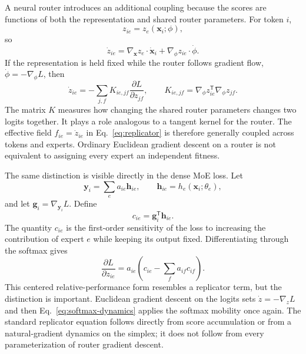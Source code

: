 \documentclass[11pt]{article}
\begin{document}
A neural router introduces an additional coupling because the scores are functions of both the representation and shared router parameters. For token $i$,
\begin{equation}
z_{ie}
=
z_e(\mathbf x_i;\phi),
\end{equation}
so
\begin{equation}
\dot z_{ie}
=
\nabla_{\mathbf x}z_e\cdot\dot{\mathbf x}_i
+
\nabla_\phi z_{ie}\cdot\dot\phi.
\label{eq:score-velocity}
\end{equation}
If the representation is held fixed while the router follows gradient flow, $\dot\phi=-\nabla_\phi L$, then
\begin{equation}
\dot z_{ie}
=
-
\sum_{j,f}
K_{ie,jf}
\frac{\partial L}{\partial z_{jf}},
\qquad
K_{ie,jf}
=
\nabla_\phi z_{ie}^{\mathsf T}
\nabla_\phi z_{jf}.
\label{eq:router-kernel}
\end{equation}
The matrix $K$ measures how changing the shared router parameters changes two logits together. It plays a role analogous to a tangent kernel for the router. The effective field $f_{ie}=\dot z_{ie}$ in Eq.~\eqref{eq:replicator} is therefore generally coupled across tokens and experts. Ordinary Euclidean gradient descent on a router is not equivalent to assigning every expert an independent fitness.

The same distinction is visible directly in the dense MoE loss. Let
\begin{equation}
\mathbf y_i
=
\sum_e a_{ie}\mathbf h_{ie},
\qquad
\mathbf h_{ie}
=
h_e(\mathbf x_i;\theta_e),
\end{equation}
and let $\mathbf g_i=\nabla_{\mathbf y_i}L$. Define
\begin{equation}
c_{ie}
=
\mathbf g_i^{\mathsf T}\mathbf h_{ie}.
\end{equation}
The quantity $c_{ie}$ is the first-order sensitivity of the loss to increasing the contribution of expert $e$ while keeping its output fixed. Differentiating through the softmax gives
\begin{equation}
\frac{\partial L}{\partial z_{ie}}
=
a_{ie}
\left(
c_{ie}
-
\sum_f a_{if}c_{if}
\right).
\label{eq:router-gradient}
\end{equation}
This centered relative-performance form resembles a replicator term, but the distinction is important. Euclidean gradient descent on the logits sets $\dot z=-\nabla_zL$ and then Eq.~\eqref{eq:softmax-dynamics} applies the softmax mobility once again. The standard replicator equation follows directly from score accumulation or from a natural-gradient dynamics on the simplex; it does not follow from every parameterization of router gradient descent.
\end{document}
